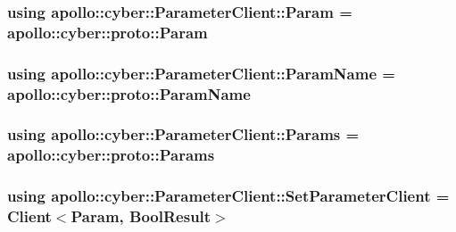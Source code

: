 \hypertarget{classapollo_1_1cyber_1_1ParameterClient_abbe01b23559ca1166de439023c2aacd1}{
\subsubsection[{Param}]{\setlength{\rightskip}{0pt plus 5cm}using {\bf apollo\-::cyber\-::\-Parameter\-Client\-::\-Param} =  apollo\-::cyber\-::proto\-::\-Param}}\label{classapollo_1_1cyber_1_1ParameterClient_abbe01b23559ca1166de439023c2aacd1}
\hypertarget{classapollo_1_1cyber_1_1ParameterClient_aab6e735de877c2611b2354ea1371c142}{
\subsubsection[{Param\-Name}]{\setlength{\rightskip}{0pt plus 5cm}using {\bf apollo\-::cyber\-::\-Parameter\-Client\-::\-Param\-Name} =  apollo\-::cyber\-::proto\-::\-Param\-Name}}\label{classapollo_1_1cyber_1_1ParameterClient_aab6e735de877c2611b2354ea1371c142}
\hypertarget{classapollo_1_1cyber_1_1ParameterClient_ad8de8a070f7cae18effe35ee1b3defb4}{
\subsubsection[{Params}]{\setlength{\rightskip}{0pt plus 5cm}using {\bf apollo\-::cyber\-::\-Parameter\-Client\-::\-Params} =  apollo\-::cyber\-::proto\-::\-Params}}\label{classapollo_1_1cyber_1_1ParameterClient_ad8de8a070f7cae18effe35ee1b3defb4}
\hypertarget{classapollo_1_1cyber_1_1ParameterClient_a2148326d395df8bc05fa03e1c92ad8fc}{
\subsubsection[{Set\-Parameter\-Client}]{\setlength{\rightskip}{0pt plus 5cm}using {\bf apollo\-::cyber\-::\-Parameter\-Client\-::\-Set\-Parameter\-Client} =  {\bf Client}$<${\bf Param}, {\bf Bool\-Result}$>$}}\label{classapollo_1_1cyber_1_1ParameterClient_a2148326d395df8bc05fa03e1c92ad8fc}


